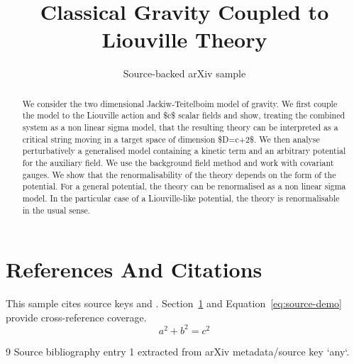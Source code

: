 \documentclass[11pt]{article}
\title{Classical Gravity Coupled to Liouville Theory}
\author{Source-backed arXiv sample}
\date{}
\begin{document}
\maketitle
\begin{abstract}
We consider the two dimensional Jackiw-Teitelboim model of gravity. We first couple the model to the Liouville action and \$c\$ scalar fields and show, treating the combined system as a non linear sigma model, that the resulting theory can be interpreted as a critical string moving in a target space of dimension \$D=c+2\$. We then analyse perturbatively a generalised model containing a kinetic term and an arbitrary potential for the auxiliary field. We use the background field method and work with covariant gauges. We show that the renormalisability of the theory depends on the form of the potential. For a general potential, the theory can be renormalised as a non linear sigma model. In the particular case of a Liouville-like potential, the theory is renormalisable in the usual sense.
\end{abstract}
\section{References And Citations}
\label{sec:refs}
This sample cites source keys \cite{any} and \cite{any}. Section~\ref{sec:refs} and Equation~\ref{eq:source-demo} provide cross-reference coverage.
\begin{equation}
\label{eq:source-demo}
a^2 + b^2 = c^2
\end{equation}
\begin{thebibliography}{9}
 Source bibliography entry 1 extracted from arXiv metadata/source key `any`.
\end{thebibliography}
\end{document}

